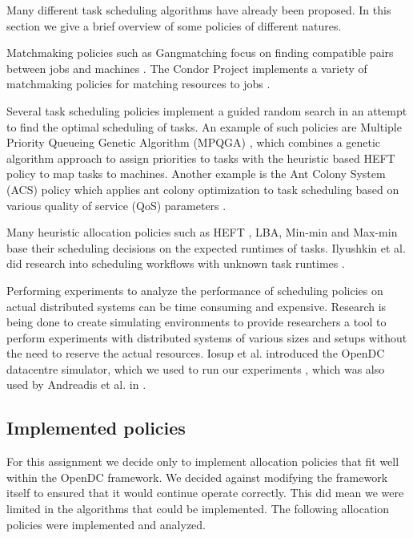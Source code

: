 \documentclass[twocolumn,a4]{scrartcl}
\begin{document}
Many different task scheduling algorithms have already been proposed. In this section we give a brief overview of some policies of different natures.

Matchmaking policies such as Gangmatching focus on finding compatible pairs between jobs and machines \cite{DBLP:conf/hpdc/RamanLS03}. The Condor Project implements a variety of matchmaking policies for matching resources to jobs \cite{DBLP:journals/concurrency/ThainTL05}\cite{DBLP:conf/sosp/IsardPCWTG09}.

Several task scheduling policies implement a guided random search in an attempt to find the optimal scheduling of tasks. An example of such policies are Multiple Priority Queueing Genetic Algorithm (MPQGA) \cite{DBLP:conf/hpcc/XuLKQ12}, which combines a genetic algorithm approach to assign priorities to tasks with the heuristic based HEFT \cite{DBLP:journals/tpds/TopcuogluHW02} policy to map tasks to machines. Another example is the Ant Colony System (ACS) policy which applies ant colony optimization to task scheduling based on various quality of service (QoS) parameters \cite{DBLP:journals/tsmc/ChenZ09}.

Many heuristic allocation policies such as HEFT \cite{DBLP:journals/tpds/TopcuogluHW02}, LBA, Min-min and Max-min \cite{DBLP:conf/hcw/ArmstrongHK98} base their scheduling decisions on the expected runtimes of tasks. Ilyushkin et al. did research into scheduling workflows with unknown task runtimes \cite{DBLP:conf/ccgrid/IlyushkinGE15}.

Performing experiments to analyze the performance of scheduling policies on actual distributed systems can be time consuming and expensive. Research is being done to create simulating environments to provide researchers a tool to perform experiments with distributed systems of various sizes and setups without the need to reserve the actual resources. Iosup et al. introduced the OpenDC datacentre simulator, which we used to run our experiments \cite{DBLP:conf/ispdc/IosupABBENOTVV17}, which was also used by Andreadis et al. in \cite{DBLP:conf/sc/AndreadisVMI18}.


\subsection{Implemented policies} \label{sec_intro_policies}

For this assignment we decide only to implement allocation policies that fit well within the OpenDC framework. We decided against modifying the framework itself to ensured that it would continue operate correctly. This did mean we were limited in the algorithms that could be implemented. The following allocation policies were implemented and analyzed.
\end{document}
